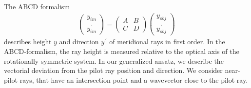 \documentclass[12pt,a4paper,twoside,openright,BCOR10mm,headsepline,titlepage,abstracton,chapterprefix,final]{scrreprt}
\begin{document}
The ABCD formalism 
\begin{eqnarray}
 \begin{pmatrix}
  y_{im} \\ y^{\,\prime}_{im}
 \end{pmatrix}
 =
 \begin{pmatrix}
   A & B \\ C & D
 \end{pmatrix}
 \begin{pmatrix}
   y_{obj} \\ y^{\,\prime}_{obj}
 \end{pmatrix}
\end{eqnarray}
describes height $y$ and direction $y^{\,\prime}$ of meridional rays in first order. 
In the ABCD-formalism, the ray height is measured relative to the optical axis of the rotationally symmetric system.
In our generalized ansatz, we describe the vectorial deviation from the pilot ray position and direction.
We consider near-pilot rays, that have an intersection point and a wavevector close to the pilot ray.
\end{document}
